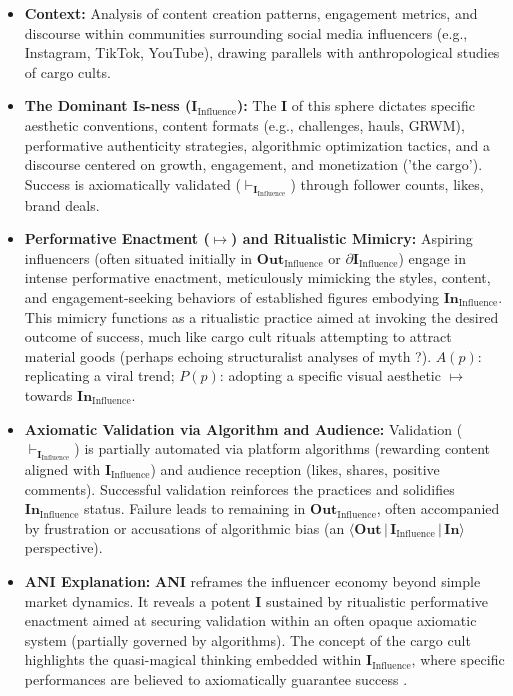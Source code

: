 \documentclass{article}
\newcommand{\ANI}{\textbf{ANI}}             %
\newcommand{\Isness}{\mathbf{I}}            %
\newcommand{\Inness}{\mathbf{In}}           %
\newcommand{\Outness}{\mathbf{Out}}         %
\newcommand{\enactment}{\ensuremath{\mapsto}} %
\newcommand{\validates}[1]{\ensuremath{\vdash_{#1}}} %
\newcommand{\boundary}[1]{\ensuremath{\partial #1}} %
\newcommand{\orientation}[3]{\ensuremath{\langle #1 \,|\, #2 \,|\, #3 \rangle}} %
\begin{document}
\begin{itemize}
    \item \textbf{Context:} Analysis of content creation patterns, engagement metrics, and discourse within communities surrounding social media influencers (e.g., Instagram, TikTok, YouTube), drawing parallels with anthropological studies of cargo cults.
    \item \textbf{The Dominant Is-ness ($\Isness_{\text{Influence}}$):} The $\Isness$ of this sphere dictates specific aesthetic conventions, content formats (e.g., challenges, hauls, GRWM), performative authenticity strategies, algorithmic optimization tactics, and a discourse centered on growth, engagement, and monetization ('the cargo'). Success is axiomatically validated ($\validates{\Isness_{\text{Influence}}}$) through follower counts, likes, brand deals.
    \item \textbf{Performative Enactment ($\enactment$) and Ritualistic Mimicry:} Aspiring influencers (often situated initially in $\Outness_{\text{Influence}}$ or $\boundary{\Isness_{\text{Influence}}}$) engage in intense performative enactment, meticulously mimicking the styles, content, and engagement-seeking behaviors of established figures embodying $\Inness_{\text{Influence}}$. This mimicry functions as a ritualistic practice aimed at invoking the desired outcome of success, much like cargo cult rituals attempting to attract material goods (perhaps echoing structuralist analyses of myth \citep{LeviStrauss1969}?). $A(p)$: replicating a viral trend; $P(p)$: adopting a specific visual aesthetic $\enactment$ towards $\Inness_{\text{Influence}}$.
    \item \textbf{Axiomatic Validation via Algorithm and Audience:} Validation ($\validates{\Isness_{\text{Influence}}}$) is partially automated via platform algorithms (rewarding content aligned with $\Isness_{\text{Influence}}$) and audience reception (likes, shares, positive comments). Successful validation reinforces the practices and solidifies $\Inness_{\text{Influence}}$ status. Failure leads to remaining in $\Outness_{\text{Influence}}$, often accompanied by frustration or accusations of algorithmic bias (an $\orientation{\Outness}{\Isness_{\text{Influence}}}{\Inness}$ perspective).
    \item \textbf{ANI Explanation:} \ANI{} reframes the influencer economy beyond simple market dynamics. It reveals a potent $\Isness$ sustained by ritualistic performative enactment aimed at securing validation within an often opaque axiomatic system (partially governed by algorithms). The concept of the cargo cult highlights the quasi-magical thinking embedded within $\Isness_{\text{Influence}}$, where specific performances are believed to axiomatically guarantee success \citep{Festinger1956}.
\end{itemize}
\end{document}
